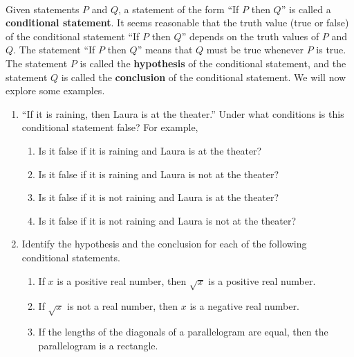 %
%
\begin{previewactivity}\label{PA:conditional} \hfill \\
Given statements $P$ and $Q$, a statement of the form ``If $P$ then $Q$'' is called a 
\textbf{conditional statement}.
%
%
 It seems reasonable that the truth value (true or false) of the conditional statement 
``If $P$ then $Q$'' depends on the truth values of $P$  and  $Q$.  The statement ``If $P$ then $Q$'' means that $Q$  must be true whenever $P$ is true.  The statement $P$ is called the \textbf{hypothesis}
%
 of the conditional statement, and the statement $Q$ is called the \textbf{conclusion}
%
 of the conditional statement.  We will now explore some examples.

\begin{enumerate}
\item ``If it is raining, then Laura is at the theater.''
Under what conditions is this conditional statement false?  For example,
\begin{enumerate}
\item Is it false if it is raining and Laura is at the theater?
\item Is it false if it is raining and Laura is not at the theater?
\item Is it false if it is not raining and Laura is at the theater?
\item Is it false if it is not raining and Laura is not at the theater?
\end{enumerate}

\item Identify the hypothesis and the conclusion for each of the following conditional statements. 
  \begin{enumerate}
\item If $x$ is a positive real number, then $\sqrt{x}$ is a positive real number.
\item If $\sqrt{x}$ is not a real number, then $x$ is a negative real number.
\item If the lengths of the diagonals of a parallelogram are equal, then the parallelogram is a rectangle.
  \end{enumerate}

\end{enumerate}
\end{previewactivity}
\hbreak
\endinput
